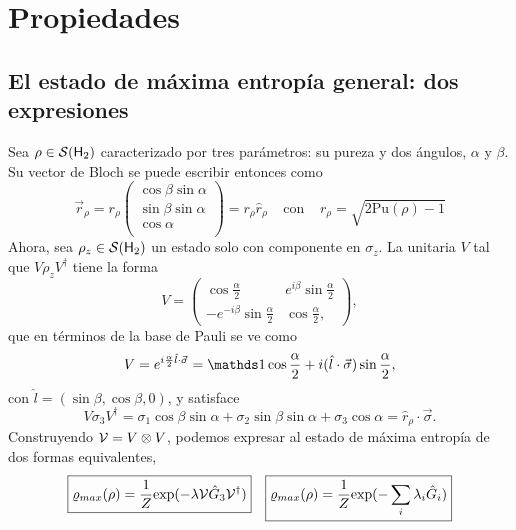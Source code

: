\section{Propiedades}



\subsection{El estado de máxima entropía general: dos expresiones}
Sea $\rho\in\mathcal{S}({\sf H}_{2})$ caracterizado por tres parámetros: su pureza y dos ángulos, $\alpha$ y $\beta$. Su vector de Bloch se puede escribir entonces como
\begin{equation}
  \vec{r}_{\rho}=r_{\rho}\begin{pmatrix}
    \cos{\beta}\sin{\alpha}\\
    \sin{\beta}\sin{\alpha}\\
    \cos{\alpha}\\
  \end{pmatrix}=r_{\rho}\hat{r}_{\rho} \; \; \; \; \text{con} \; \; \; \; r_{\rho}=\sqrt{2\text{Pu}(\rho)-1}
\end{equation}
Ahora, sea $\rho_{z}\in\mathcal{S}({\sf H}_{2})$ un estado solo con componente en $\sigma_{z}$. La unitaria $V$ tal que $V\rho_{z} V^{\dag}$ tiene la forma
\begin{equation}
  V=
  \begin{pmatrix}
      \cos{\frac{\alpha}{2}} & e^{i\beta}\sin{\frac{\alpha}{2}}\\
      -e^{-i\beta}\sin{\frac{\alpha}{2}}& \cos{\frac{\alpha}{2}},
  \end{pmatrix},
\end{equation}
que en términos de la base de Pauli se ve como
\begin{equation}
  V=e^{i\frac{\alpha}{2} \hat{l}\cdot \vec{\sigma}}=\Id \cos{\frac{\alpha}{2}}+i(\hat{l}\cdot \vec{\sigma})\sin{\frac{\alpha}{2}},
\end{equation}
con $\hat{l}=(\sin{\beta},\cos{\beta},0)$, y satisface
\begin{equation}\label{eq:VsigmazV}
  V\sigma_{3}V^{\dag}=\sigma_{1}\cos{\beta}\sin{\alpha}+\sigma_{2}\sin{\beta}\sin{\alpha}+\sigma_{3}\cos{\alpha}=\hat{r}_{\rho}\cdot\vec{\sigma}.
\end{equation}
Construyendo $\mathcal{V}=V\otimes V$, podemos expresar al estado de máxima entropía de dos formas equivalentes,
\begin{align}\label{eq:MaxEntTwoExpr}
  \boxed{\varrho_{max}(\rho)=\frac{1}{Z}\text{exp}(-\lambda\mathcal{V}\hat{G}_{3}\mathcal{V}^{\dag})} && \boxed{\varrho_{max}(\rho)=\frac{1}{Z}\text{exp}(-\sum_{i}\lambda_{i}\hat{G}_{i})}
\end{align} 

